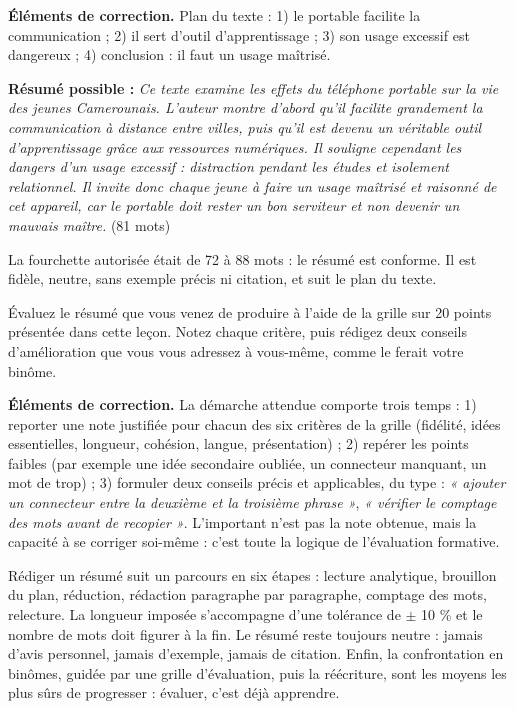 \documentclass[11pt]{article}
\begin{document}
\begin{corrige}
\textbf{Éléments de correction.} Plan du texte : 1) le portable facilite la communication ; 2) il sert d'outil d'apprentissage ; 3) son usage excessif est dangereux ; 4) conclusion : il faut un usage maîtrisé.

\textbf{Résumé possible :} \emph{Ce texte examine les effets du téléphone portable sur la vie des jeunes Camerounais. L'auteur montre d'abord qu'il facilite grandement la communication à distance entre villes, puis qu'il est devenu un véritable outil d'apprentissage grâce aux ressources numériques. Il souligne cependant les dangers d'un usage excessif : distraction pendant les études et isolement relationnel. Il invite donc chaque jeune à faire un usage maîtrisé et raisonné de cet appareil, car le portable doit rester un bon serviteur et non devenir un mauvais maître.} (81 mots)

La fourchette autorisée était de 72 à 88 mots : le résumé est conforme. Il est fidèle, neutre, sans exemple précis ni citation, et suit le plan du texte.
\end{corrige}

\begin{exercice}
Évaluez le résumé que vous venez de produire à l'aide de la grille sur 20 points présentée dans cette leçon. Notez chaque critère, puis rédigez deux conseils d'amélioration que vous vous adressez à vous-même, comme le ferait votre binôme.
\end{exercice}

\begin{corrige}
\textbf{Éléments de correction.} La démarche attendue comporte trois temps : 1) reporter une note justifiée pour chacun des six critères de la grille (fidélité, idées essentielles, longueur, cohésion, langue, présentation) ; 2) repérer les points faibles (par exemple une idée secondaire oubliée, un connecteur manquant, un mot de trop) ; 3) formuler deux conseils précis et applicables, du type : \emph{« ajouter un connecteur entre la deuxième et la troisième phrase »}, \emph{« vérifier le comptage des mots avant de recopier »}. L'important n'est pas la note obtenue, mais la capacité à se corriger soi-même : c'est toute la logique de l'évaluation formative.
\end{corrige}

\begin{aretenir}
Rédiger un résumé suit un parcours en six étapes : lecture analytique, brouillon du plan, réduction, rédaction paragraphe par paragraphe, comptage des mots, relecture. La longueur imposée s'accompagne d'une tolérance de $\pm$ 10 \% et le nombre de mots doit figurer à la fin. Le résumé reste toujours neutre : jamais d'avis personnel, jamais d'exemple, jamais de citation. Enfin, la confrontation en binômes, guidée par une grille d'évaluation, puis la réécriture, sont les moyens les plus sûrs de progresser : évaluer, c'est déjà apprendre.
\end{aretenir}
\end{document}
